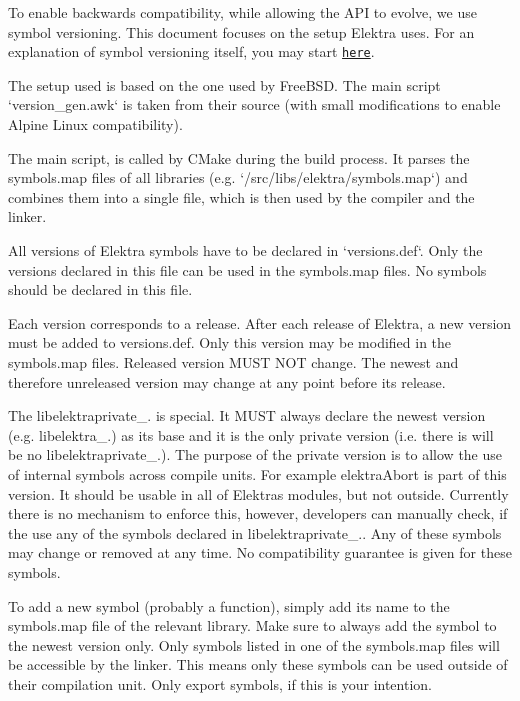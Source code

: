 To enable backwards compatibility, while allowing the A\+PI to evolve, we use symbol versioning. This document focuses on the setup Elektra uses. For an explanation of symbol versioning itself, you may start \href{https://people.freebsd.org/~deischen/symver/library_versioning.txt}{\tt here}.

The setup used is based on the one used by Free\+B\+SD. The main script `version\+\_\+gen.awk` is taken from their source (with small modifications to enable Alpine Linux compatibility).

The main script, is called by C\+Make during the build process. It parses the {\ttfamily symbols.\+map} files of all libraries (e.\+g. `/src/libs/elektra/symbols.map`) and combines them into a single file, which is then used by the compiler and the linker.

All versions of Elektra symbols have to be declared in `versions.def`. Only the versions declared in this file can be used in the {\ttfamily symbols.\+map} files. No symbols should be declared in this file.

Each version corresponds to a release. After each release of Elektra, a new version must be added to {\ttfamily versions.\+def}. Only this version may be modified in the {\ttfamily symbols.\+map} files. Released version M\+U\+ST N\+OT change. The newest and therefore unreleased version may change at any point before its release.

The {\ttfamily libelektraprivate\+\_.} is special. It M\+U\+ST always declare the newest version (e.\+g. {\ttfamily libelektra\+\_.}) as its base and it is the only private version (i.\+e. there is will be no {\ttfamily libelektraprivate\+\_.}). The purpose of the private version is to allow the use of internal symbols across compile units. For example {\ttfamily elektra\+Abort} is part of this version. It should be usable in all of Elektra\textquotesingle{}s modules, but not outside. Currently there is no mechanism to enforce this, however, developers can manually check, if the use any of the symbols declared in {\ttfamily libelektraprivate\+\_.}. Any of these symbols may change or removed at any time. No compatibility guarantee is given for these symbols.

To add a new symbol (probably a function), simply add its name to the {\ttfamily symbols.\+map} file of the relevant library. Make sure to always add the symbol to the newest version only. Only symbols listed in one of the {\ttfamily symbols.\+map} files will be accessible by the linker. This means only these symbols can be used outside of their compilation unit. Only export symbols, if this is your intention.

